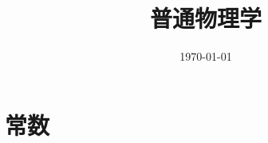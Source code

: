 \documentclass{article}
\title{普通物理学}
\author{}
\date{\today}
\begin{document}
\hypersetup{
    hidelinks,
    allcolors = black,
    breaklinks = true
}

\newtheorem{definition}{Definition}[subsubsection]
\newtheorem{theorem}{Theorem}[subsubsection]
\newtheorem{corollary}{Corollary}[theorem]
\renewcommand{\proofname}{\indent\bf Proof}

\def\d{\mathrm d}
\def\scre{\mathscr E}

\newcommand{\bs}[1]{\boldsymbol{#1}}
\newcommand{\p}[1]{\left(#1\right)}

\begin{titlepage}
    \maketitle
\end{titlepage}

\tableofcontents
\newpage

\section{常数}
\end{document}

